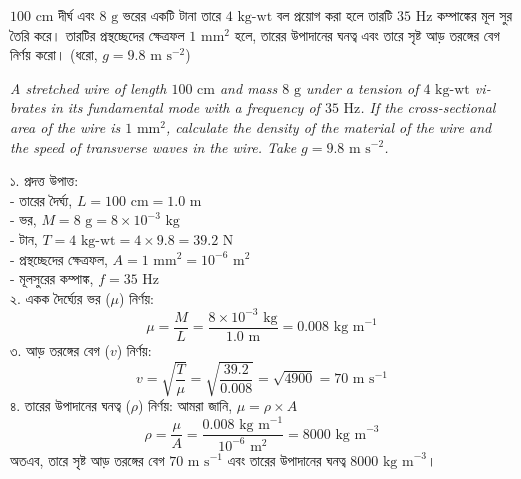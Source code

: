 \documentclass[12pt, a4paper]{article}
\begin{document}
\vspace{1.5em}

\begin{tcolorbox}[questionbox={প্রশ্ন (Question) 2}]
\noindent
$100\text{ cm}$ দীর্ঘ এবং $8\text{ g}$ ভরের একটি টানা তারে $4\text{ kg-wt}$ বল প্রয়োগ করা হলে তারটি $35\text{ Hz}$ কম্পাঙ্কের মূল সুর তৈরি করে। তারটির প্রস্থচ্ছেদের ক্ষেত্রফল $1\text{ mm}^2$ হলে, তারের উপাদানের ঘনত্ব এবং তারে সৃষ্ট আড় তরঙ্গের বেগ নির্ণয় করো। (ধরো, $g = 9.8\text{ m s}^{-2}$)

\vspace{0.8em}
\begin{english}
\noindent\textit{\color{darkgray}
A stretched wire of length $100\text{ cm}$ and mass $8\text{ g}$ under a tension of $4\text{ kg-wt}$ vibrates in its fundamental mode with a frequency of $35\text{ Hz}$. If the cross-sectional area of the wire is $1\text{ mm}^2$, calculate the density of the material of the wire and the speed of transverse waves in the wire. Take $g = 9.8\text{ m s}^{-2}$.
}
\end{english}
\end{tcolorbox}

\vspace{1em}

\begin{tcolorbox}[solutionbox={সমাধান (Solution)}]
\noindent
১. প্রদত্ত উপাত্ত: \\
- তারের দৈর্ঘ্য, $L = 100\text{ cm} = 1.0\text{ m}$ \\
- ভর, $M = 8\text{ g} = 8 \times 10^{-3}\text{ kg}$ \\
- টান, $T = 4\text{ kg-wt} = 4 \times 9.8 = 39.2\text{ N}$ \\
- প্রস্থচ্ছেদের ক্ষেত্রফল, $A = 1\text{ mm}^2 = 10^{-6}\text{ m}^2$ \\
- মূলসুরের কম্পাঙ্ক, $f = 35\text{ Hz}$ \\
২. একক দৈর্ঘ্যের ভর ($\mu$) নির্ণয়:
\[ \mu = \frac{M}{L} = \frac{8 \times 10^{-3}\text{ kg}}{1.0\text{ m}} = 0.008\text{ kg m}^{-1} \]
৩. আড় তরঙ্গের বেগ ($v$) নির্ণয়:
\[ v = \sqrt{\frac{T}{\mu}} = \sqrt{\frac{39.2}{0.008}} = \sqrt{4900} = 70\text{ m s}^{-1} \]
৪. তারের উপাদানের ঘনত্ব ($\rho$) নির্ণয়: আমরা জানি, $\mu = \rho \times A$
\[ \rho = \frac{\mu}{A} = \frac{0.008\text{ kg m}^{-1}}{10^{-6}\text{ m}^2} = 8000\text{ kg m}^{-3} \]
অতএব, তারে সৃষ্ট আড় তরঙ্গের বেগ $70\text{ m s}^{-1}$ এবং তারের উপাদানের ঘনত্ব $8000\text{ kg m}^{-3}$।
\end{tcolorbox}
\end{document}

